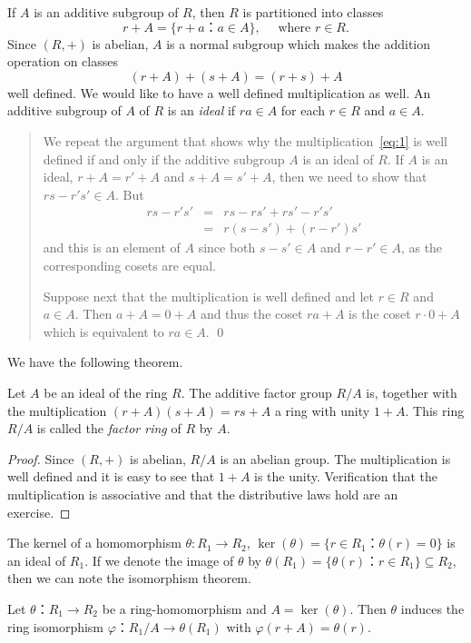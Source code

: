 If $A$ is an additive subgroup of $R$, then $R$ is partitioned into classes
\begin{displaymath}
  r + A = \{ r+a ： a ∈A\}, \quad \text{ where } r ∈R. 
\end{displaymath}
Since $(R,+)$ is abelian, $A$ is a normal subgroup which makes the addition operation on classes
\begin{equation}\label{eq:1}
  (r + A ) + (s + A) = (r+s) + A
\end{equation}
well defined. We would like to have a well defined multiplication as well. 
An additive subgroup of $A$ of $R$ is an \emph{ideal} if $ra ∈ A$ for each $r∈R$ and $a ∈A$.
\begin{quote}
  \small  We repeat the argument that shows  why the multiplication~\eqref{eq:1} is well defined if and only if the additive subgroup $A$ is an ideal of $R$. If $A$ is an ideal, $r+A = r'+A$ and $s +A = s'+A$, then we need to show that $rs - r's' ∈ A$. But
  \begin{eqnarray*}
    rs - r's' & = & rs - rs' + rs' - r's' \\
              & = & r(s-s') + (r - r') s' 
  \end{eqnarray*}
  and this is an element of $A$ since both $s-s' ∈A$ and $r-r' ∈A$, as the corresponding cosets are equal.

Suppose next that the multiplication is well defined and let $r ∈R$ and $a ∈A$. Then $a+A = 0+A$ and thus the coset $ra +A$ is the coset $r⋅0 +A$  which is equivalent to $ra ∈A$. \qed
\end{quote}

We have the following theorem.
\begin{theorem}
  \label{thr:1}
  Let $A$ be an ideal of the  ring $R$. The additive factor group $R / A$ is, together with the multiplication $(r+A ) (s+A) = rs+A$ a ring with unity $1+A$.   This ring $R/A$ is called the \emph{factor ring} of $R$ by $A$.
\end{theorem}
\begin{proof}
  Since $(R,+)$ is abelian, $R/A$ is an abelian group. The multiplication is well defined and it is easy to see that $1 +A$ is the unity. Verification that the multiplication is associative and that the distributive laws hold are an exercise. 
\end{proof}

The kernel of a homomorphism $θ: R_1 → R_2$, $\ker(θ) = \{ r ∈ R_1 ：θ(r) = 0\}$ is an ideal of $R_1$. If we denote the image of $θ$ by $θ(R_1) = \{ θ(r) ：r ∈R_1\} ⊆ R_2$, then we can note the isomorphism theorem.
\begin{theorem}
  \label{thr:2}
  Let $θ：R_1 →R_2$ be a ring-homomorphism and $A = \ker(θ)$. Then $θ$ induces the ring isomorphism $φ：R_1 / A → θ(R_1)$ with $φ(r +A) = θ(r)$. 
\end{theorem}


